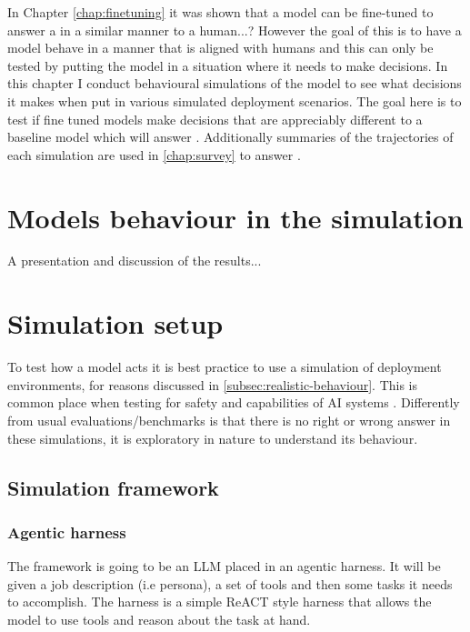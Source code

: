 In Chapter \ref{chap:finetuning} it was shown that a model can be fine-tuned to answer a  in a similar manner to a human...? However the goal of this is to have a model behave in a manner that is aligned with humans and this can only be tested by putting the model in a situation where it needs to make decisions. In this chapter I conduct behavioural simulations of the model to see what decisions it makes when put in various simulated deployment scenarios. The goal here is to test if fine tuned models make decisions that are appreciably different to a baseline model which will answer . Additionally summaries of the trajectories of each simulation are used in \ref{chap:survey} to answer .


\section{Models behaviour in the simulation}

A presentation and discussion of the results...



\section{Simulation setup}

To test how a model acts it is best practice to use a simulation of deployment environments, for reasons discussed in \ref{subsec:realistic-behaviour}. This is common place when testing for safety and capabilities of AI systems \cite{}. Differently from usual evaluations/benchmarks is that there is no right or wrong answer in these simulations, it is exploratory in nature to understand its behaviour.




\subsection{Simulation framework}

\subsubsection{Agentic harness}

The framework is going to be an LLM placed in an agentic harness. It will be given a job description (i.e persona), a set of tools and then some tasks it needs to accomplish. The harness is a simple ReACT \cite{yaoReActSynergizingReasoning2023} style harness that allows the model to use tools and reason about the task at hand.

